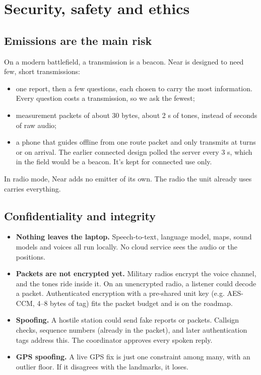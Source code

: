 \chapter{Security, safety and ethics}\label{ch:security}

\section{Emissions are the main risk}

On a modern battlefield, a transmission is a beacon. Near is designed to need few, short transmissions:
\begin{itemize}
  \item one report, then a few questions, each chosen to carry the most information. Every question costs a
        transmission, so we ask the fewest;
  \item measurement packets of about 30 bytes, about 2 s of tones, instead of seconds of raw audio;
  \item a phone that guides offline from one route packet and only transmits at turns or on arrival. The earlier
        connected design polled the server every 3 s, which in the field would be a beacon. It's kept for
        connected use only.
\end{itemize}
In radio mode, Near adds no emitter of its own. The radio the unit already uses carries everything.

\section{Confidentiality and integrity}

\begin{itemize}
  \item \textbf{Nothing leaves the laptop.} Speech-to-text, language model, maps, sound models and voices all run locally. No
        cloud service sees the audio or the positions.
  \item \textbf{Packets are not encrypted yet.} Military radios encrypt the voice channel, and the tones ride inside it.
        On an unencrypted radio, a listener could decode a packet. Authenticated encryption with a pre-shared unit key
        (e.g. AES-CCM, 4--8 bytes of tag) fits the packet budget and is on the roadmap.
  \item \textbf{Spoofing.} A hostile station could send fake reports or packets. Callsign checks, sequence numbers (already in the
        packet), and later authentication tags address this. The coordinator approves every spoken reply.
  \item \textbf{GPS spoofing.} A live GPS fix is just one constraint among many, with an outlier floor. If it disagrees with the
        landmarks, it loses.
\end{itemize}

